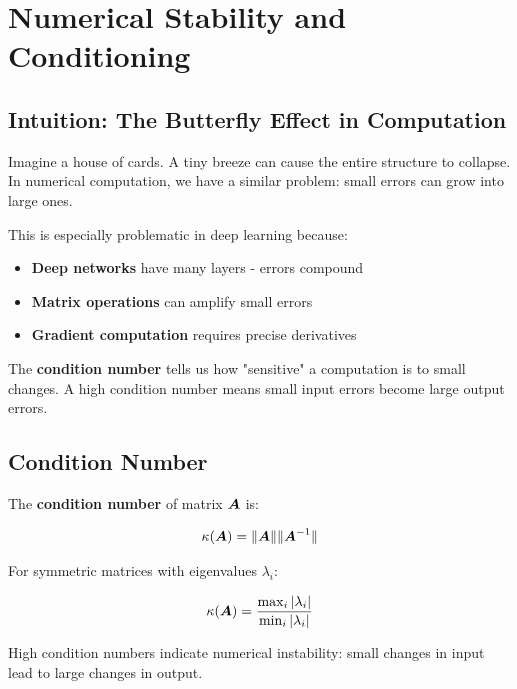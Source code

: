 
\section{Numerical Stability and Conditioning}
\label{sec:numerical-stability}

\subsection{Intuition: The Butterfly Effect in Computation}

Imagine a house of cards. A tiny breeze can cause the entire structure to collapse. In numerical computation, we have a similar problem: small errors can grow into large ones.

This is especially problematic in deep learning because:
\begin{itemize}
    \item \textbf{Deep networks} have many layers - errors compound
    \item \textbf{Matrix operations} can amplify small errors
    \item \textbf{Gradient computation} requires precise derivatives
\end{itemize}

The \textbf{condition number} tells us how "sensitive" a computation is to small changes. A high condition number means small input errors become large output errors.

\subsection{Condition Number}

The \textbf{condition number} of matrix $\boldsymbol{A}$ is:

\begin{equation}
\kappa(\boldsymbol{A}) = \|\boldsymbol{A}\| \|\boldsymbol{A}^{-1}\|
\end{equation}

For symmetric matrices with eigenvalues $\lambda_i$:

\begin{equation}
\kappa(\boldsymbol{A}) = \frac{\max_i |\lambda_i|}{\min_i |\lambda_i|}
\end{equation}

High condition numbers indicate numerical instability: small changes in input lead to large changes in output.

